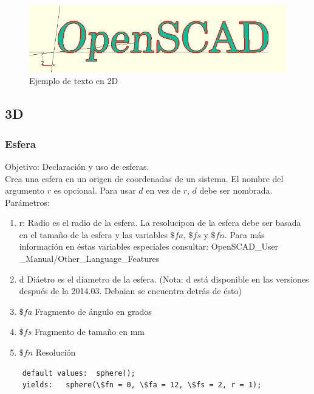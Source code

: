 \documentclass{article}
\begin{document}
\begin{figure}[h!]
    \centering
    \includegraphics[scale=0.5]{Imagenes/OpenSCADtext.png}
    \caption{Ejemplo de texto en 2D}
    \label{fig:ejemploTexto}
\end{figure}


\subsection{3D}


\subsubsection{Esfera}

Objetivo: Declaración y uso de esferas.\citep{OpenSCS}\\

Crea una esfera en un origen de coordenadas de un sistema. El nombre del argumento $r$ es opcional. Para usar $d$ en vez de $r$, $d$ debe ser nombrada.\citep{OpenSCADtext}\\

Parámetros:\\

\begin{enumerate}
    \item r: Radio es el radio de la esfera. La resolucipon de la esfera debe ser basada en el tamaño de la esfera y las variables $\$fa $, $\$fs$ y $\$fn$. Para más información en éstas variables especiales consultar: OpenSCAD\_User \_Manual/Other\_Language\_Features
    \item d Diáetro es el díametro de la esfera. (Nota: d está disponible en las versiones después de la 2014.03. Debaian se encuentra detrás de ésto)
    \item $\$fa $ Fragmento de ángulo en grados
    \item $\$fs$ Fragmento de tamaño en mm
    \item $\$fn$ Resolución
\end{enumerate}

\begin{verbatim}
    default values:  sphere();  
    yields:   sphere(\$fn = 0, \$fa = 12, \$fs = 2, r = 1);
\end{verbatim}
\end{document}
